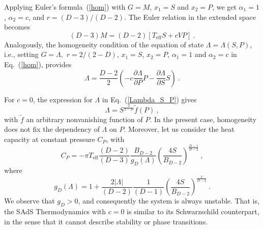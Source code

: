\documentclass[prd,onecolumn,notitlepage,amsmath,nofootinbib,superscriptaddress,showpacs,showkeys]{revtex4-1}
\begin{document}
Applying Euler's formula~(\ref{hom}) with $G=M$, $x_{1}=S$ and
$x_{2}=P$, we get $\alpha_{1}=1$, $\alpha_{2}=c$, and $r=\left(D-3\right)/\left(D-2\right)$.
The Euler relation in the extended space becomes 
\begin{equation}
\left(D-3\right)M=\left(D-2\right)\left[T_{\mathrm{eff}}S+cVP\right]~.\label{re}
\end{equation}
Analogously, the homogeneity condition of the equation of state $\Lambda=\Lambda\left(S,P\right)$,
i.e., setting $G=\Lambda,$ $r=2/(2-D)$, $x_{1}=S$, $x_{2}=P$,
$\alpha_{1}=1$ and $\alpha_{2}=c$ in Eq.~(\ref{hom}), provides
\begin{equation}
\Lambda=\frac{D-2}{2}\left(-c\frac{\partial\Lambda}{\partial P}P-\frac{\partial\Lambda}{\partial S}S\right)~.\label{Lambda_S_P}
\end{equation}
%

For $c=0$, the expression for $\Lambda$ in Eq.~(\ref{Lambda_S_P})
gives 
\begin{equation}
\Lambda=S^{\frac{2}{2-D}}\tilde{f}\left(P\right)~,
\end{equation}
with $\tilde{f}$ an arbitrary nonvanishing function of $P$. In the
present case, homogeneity does not fix the dependency of $\Lambda$
on $P$. Moreover, let us consider the heat capacity at constant pressure $C_{P}$, with
\begin{equation}
C_{P}=-\pi T_{\mathrm{eff}}\frac{\left(D-2\right)}{\left(D-3\right)}\frac{B_{D-2}}{g_{D}\left(\Lambda\right)}\left(\frac{4S}{B_{D-2}}\right)^{\frac{D-1}{D-2}}~,
\end{equation}
where 
\begin{equation}
g_{D}\left(\Lambda\right)=1+\frac{2\left|\Lambda\right|}{\left(D-2\right)}\frac{1}{\left(D-1\right)}\left(\frac{4S}{B_{D-2}}\right)^{\frac{2}{D-2}}~.
\end{equation}
We observe that $g_{D}>0$, and consequently the system is always unstable. That is, the SAdS Thermodynamics with $c=0$
is similar to its Schwarzschild counterpart, in the sense that it cannot describe stability or phase transitions.
\end{document}
